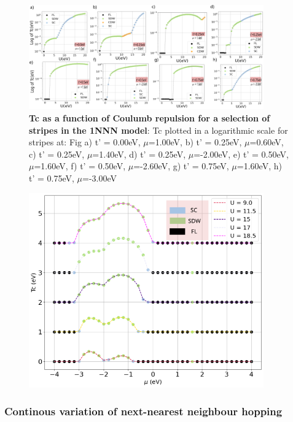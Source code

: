 \documentclass[12pt]{article}
\begin{document}
\begin{figure}[htbp]  %
    \centering
    \includegraphics[width=0.90\textwidth]{1NNNstripes.png}  %
    \caption{\textbf{Tc as a function of Coulumb repulsion for a selection of stripes in the 1NNN model}: Tc plotted in
    a logarithmic scale for stripes at:  Fig a) t' = 0.00eV, $\mu$=1.00eV, b) t' = 0.25eV, $\mu$=0.60eV, c) t' = 0.25eV, $\mu$=1.40eV,
    d) t' = 0.25eV, $\mu$=-2.00eV,
    e) t' = 0.50eV, $\mu$=1.60eV,
    f) t' = 0.50eV, $\mu$=-2.60eV,
    g) t' = 0.75eV, $\mu$=1.60eV, 
    h) t' = 0.75eV, $\mu$=-3.00eV}
    \label{fig:1NNNStripes}
\end{figure}

\begin{figure}[htbp]  %
    \centering
    \includegraphics[width=0.90\textwidth]{1NNN050Dome.png}  %
    \label{fig:1NNNDome}
\end{figure}

\newpage

\subsubsection{Continous variation of next-nearest neighbour hopping}
\end{document}
